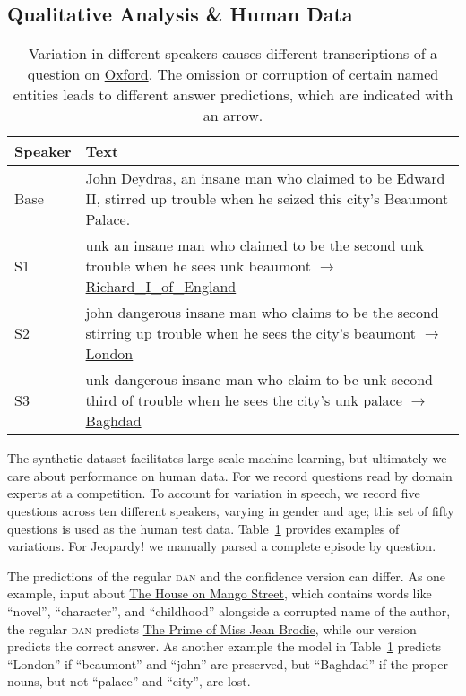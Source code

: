 \subsection{Qualitative Analysis \& Human Data}
\label{sec:human-data}
\begin{table}[t!]
	\small
	\setlength\tabcolsep{4pt}
	\centering
	\begin{tabularx}{\textwidth}{p{2cm}p{12cm}}
		Speaker & Text \\
		\midrule
		Base & John Deydras, an insane man who claimed to be Edward II, stirred up trouble when he seized this city's Beaumont Palace.\\
	     \rowcolor{gray!25}
		S1 & unk an insane man who claimed to be the second unk trouble when he sees unk beaumont  $\rightarrow$ \underline{Richard\_I\_of\_England} \\
		 \rowcolor{white}
		S2 & john dangerous insane man who claims to be the second stirring up trouble when he sees the city's beaumont $\rightarrow$ \underline{London}\\
		 \rowcolor{gray!25}
		S3 & unk dangerous insane man who claim to be unk second third of trouble when he sees the city's unk palace  $\rightarrow$ \underline{Baghdad}\\
	\end{tabularx}
		\caption{Variation in different speakers causes different transcriptions of a question on \underline{Oxford}.  The omission or corruption of certain named entities leads to different answer predictions, which are indicated with an arrow. }
	\label{fig:human_data}
\end{table}



The synthetic dataset facilitates large-scale machine learning, but ultimately we care about performance on human data.
For \qb{} we record questions read by domain experts at a competition.
To account for variation in speech, we record five questions across ten different speakers, varying in gender and age; this set of fifty questions is used as the human test data.
Table~\ref{fig:human_data} provides examples of variations.
For Jeopardy! we manually parsed a complete episode by question.



The predictions of the regular \textsc{dan} and the confidence version
can differ.    As one example, input about \underline{The House on Mango Street}, which contains words like ``novel'', ``character'', and ``childhood'' alongside a
corrupted name of the author, the regular \textsc{dan} predicts
\underline{The Prime of Miss Jean Brodie}, while our version predicts
the correct answer.
%
As another example the model in Table~\ref{fig:human_data} predicts ``London'' if ``beaumont'' and ``john'' are preserved, but ``Baghdad'' if the proper nouns, but not ``palace'' and ``city'', are lost.  


